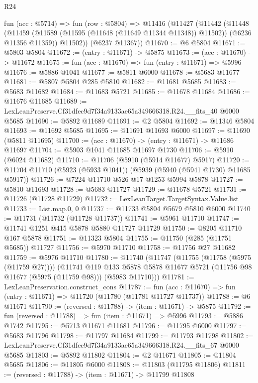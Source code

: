 \begin{lexlean}{R24}
\begin{coremodule}
  fun (acc : @5714) =>
  fun (row : @5804) =>
  @11416
    (@11427
      (@11442
        (@11448
          (@11459 (@11589 (@11595 (@11648 (@11649 @11344 @11348)) @11502)) (@6236 @11356 @11359))
          @11502))
      (@6237 @11367))
@11670 := @6 @5804
@11671 := @5803 @5804
@11672 := (entry : @11671) -> @5875
@11673 := (acc : @11670) -> @11672
@11675 := fun (acc : @11670) => fun (entry : @11671) => @5996
@11676 := @5886 @1041
@11677 := @5811 @6000
@11678 := @5683 @11677
@11681 := @5807 @5804 @285 @5810
@11682 := @11681 @5685
@11683 := @5683 @11682
@11684 := @11683 @5721
@11685 := @11678 @11684
@11686 := @11676 @11685
@11689 := LexLeanPreserve.Cf31dfec9d7f34a9133ae65a349666318.R24.__fits_40 @6000 @5685
@11690 := @5892 @11689
@11691 := @2 @5804
@11692 := @11346 @5804
@11693 := @11692 @5685
@11695 := @11691 @11693 @6000
@11697 := @11690 (@5811 @11695)
@11700 := (acc : @11670) -> (entry : @11671) -> @11686 @11697
@11704 := @5903 @1041 @11685 @11697 @1730
@11706 := @5910 (@6024 @11682)
@11710 := @11706 (@5910 (@5914 @11677) @5917)
@11720 := @11704 @11710 (@5923 (@5933 @1041)) (@5939 (@5940 (@5941 @1730) @11685 @5917))
@11726 := @7224 @11710 @526 @17 @1253 @5994 @5878
@11727 := @5810 @11693
@11728 := @5683 @11727
@11729 := @11678 @5721
@11731 := @11726 (@11728 @11729)
@11732 := LexLeanTarget.TargetSyntax.Value.list
@11733 := List.map.{0, 0}
@11737 := @11733 @5804 @5679 @5810 @6000
@11740 := @11731 (@11732 (@11728 @11737))
@11741 := @5961 @11710
@11747 := @11741 @1251 @415 @5878 @5880 @11727 @11729
@11750 := @8205 @11710 @167 @5878
@11751 := @11323 @5804
@11755 := @11750 (@285 (@11751 @5685)) @11727
@11756 := @5970 @11710
@11758 := @11756 @27 @11682
@11759 := @5976 @11710
@11780 := @11740
    (@11747
      (@11755 (@11758 (@5975 (@11759 @27))))
      (@11741
        @119
        @133
        @5878
        @5878
        @11677
        @5721
        (@11756 @98 @11677 (@5975 (@11759 @98)))
        (@5983 @11710)))
@11781 := LexLeanPreservation.construct_cons
@11787 := fun (acc : @11670) => fun (entry : @11671) => @11720 (@11780 (@11781 @11727 @11737))
@11788 := @6 @11671
@11790 := (reversed : @11788) -> (item : @11671) -> @5875
@11792 := fun (reversed : @11788) => fun (item : @11671) => @5996
@11793 := @5886 @1742
@11795 := @5713 @11671 @11681
@11796 := @11795 @6000
@11797 := @5683 @11796
@11798 := @11797 @11684
@11799 := @11793 @11798
@11802 := LexLeanPreserve.Cf31dfec9d7f34a9133ae65a349666318.R24.__fits_67 @6000 @5685
@11803 := @5892 @11802
@11804 := @2 @11671
@11805 := @11804 @5685
@11806 := @11805 @6000
@11808 := @11803 (@11795 @11806)
@11811 := (reversed : @11788) -> (item : @11671) -> @11799 @11808

\end{coremodule}
\end{lexlean}
